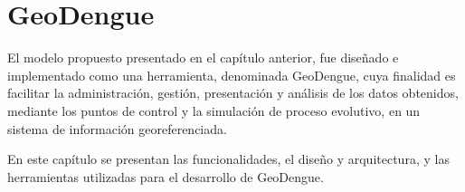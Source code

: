\chapter{GeoDengue}
El modelo propuesto presentado en el capítulo anterior, fue diseñado e implementado como una
herramienta, denominada GeoDengue, cuya finalidad es facilitar la administración, gestión,
presentación y análisis de los datos obtenidos, mediante los puntos de control y la simulación de
proceso evolutivo, en un sistema de información georeferenciada.

En este capítulo se presentan las funcionalidades, el diseño y arquitectura, y las herramientas utilizadas para el desarrollo de GeoDengue.

%




%

